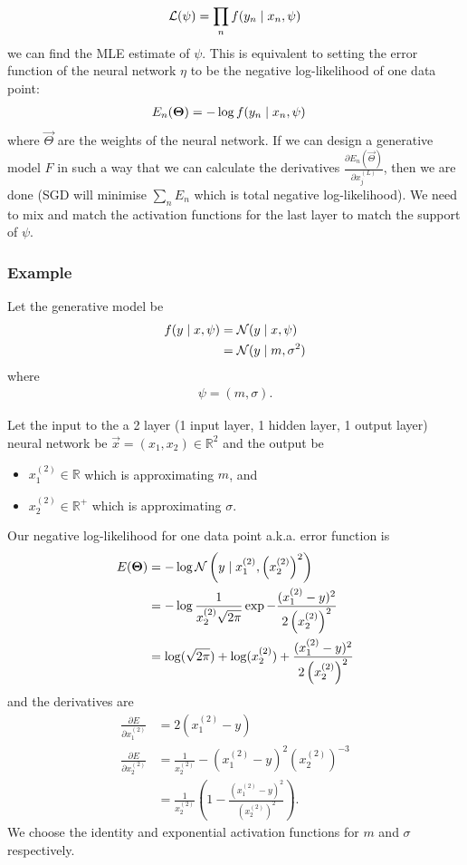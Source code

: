 \begin{align}
    \mathcal L(\psi) = \prod_n f(y_n \mid x_n, \psi)
\end{align}
we can find the MLE estimate of $\psi$. This is equivalent to setting the error function of the neural network $\eta$ to be the negative log-likelihood of one data point:
\begin{align}
    E_n(\boldsymbol{\mathbf{\Theta}})    &= -\log f(y_n \mid x_n, \psi)
\end{align}
where $\vec \Theta$ are the weights of the neural network. If we can design a generative model $F$ in such a way that we can calculate the derivatives $\frac{\partial E_n(\vec \Theta)}{\partial x_j^{(L)}}$, then we are done (SGD will minimise $\sum_n E_n$ which is total negative log-likelihood). We need to mix and match the activation functions for the last layer to match the support of $\psi$.

\subsubsection{Example}
Let the generative model be
\begin{align}
    f(y \mid x, \psi) &= \operatorname{\mathcal N}(y \mid x, \psi) \\
                        &= \operatorname{\mathcal N}(y \mid m, \sigma^2)
\end{align}
where
\begin{align}
    \psi = (m, \sigma).
\end{align}

Let the input to the a 2 layer (1 input layer, 1 hidden layer, 1 output layer) neural network be $\vec x = (x_1, x_2) \in \mathbb R^2$ and the output be
\begin{itemize}
    \item $x_1^{(2)} \in \mathbb R$ which is approximating $m$, and
    \item $x_2^{(2)} \in \mathbb R^+$ which is approximating $\sigma$.
\end{itemize}

Our negative log-likelihood for one data point a.k.a. error function is
\begin{align}
    E(\boldsymbol{\mathbf{\Theta}})  &= -\log\operatorname{\mathcal N}\left(y \mid x_1^{(2)}, \left(x_2^{(2)}\right)^2\right) \\
                    &= -\log \frac{1}{x_2^{(2)} \sqrt{2\pi}} \exp{-\frac{(x_1^{(2)} - y)^2}{2\left(x_2^{(2)}\right)^2}} \\
                    &= \log(\sqrt{2\pi}) + \log(x_2^{(2)}) + \frac{(x_1^{(2)} - y)^2}{2\left(x_2^{(2)}\right)^2}
\end{align}
and the derivatives are
\begin{align}
    \frac{\partial E}{\partial x_1^{(2)}}  &= 2\left(x_1^{(2)} - y\right) \\
    \frac{\partial E}{\partial x_2^{(2)}}  &= \frac{1}{x_2^{(2)}} - \left(x_1^{(2)} - y\right)^2\left(x_2^{(2)}\right)^{-3} \\
                                    &= \frac{1}{x_2^{(2)}}\left(1 - \frac{(x_1^{(2)} - y)^2}{\left(x_2^{(2)}\right)^2}\right).
\end{align}
We choose the identity and exponential activation functions for $m$ and $\sigma$ respectively.